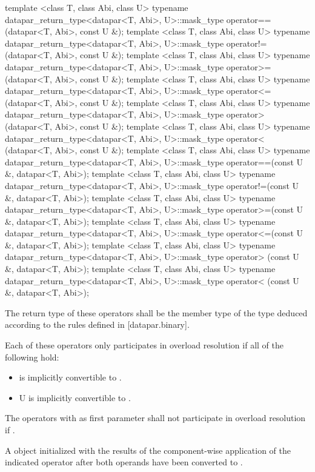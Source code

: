\begin{itemdecl}
template <class T, class Abi, class U>
typename datapar_return_type<datapar<T, Abi>, U>::mask_type operator==(datapar<T, Abi>, const U &);
template <class T, class Abi, class U>
typename datapar_return_type<datapar<T, Abi>, U>::mask_type operator!=(datapar<T, Abi>, const U &);
template <class T, class Abi, class U>
typename datapar_return_type<datapar<T, Abi>, U>::mask_type operator>=(datapar<T, Abi>, const U &);
template <class T, class Abi, class U>
typename datapar_return_type<datapar<T, Abi>, U>::mask_type operator<=(datapar<T, Abi>, const U &);
template <class T, class Abi, class U>
typename datapar_return_type<datapar<T, Abi>, U>::mask_type operator> (datapar<T, Abi>, const U &);
template <class T, class Abi, class U>
typename datapar_return_type<datapar<T, Abi>, U>::mask_type operator< (datapar<T, Abi>, const U &);
template <class T, class Abi, class U>
typename datapar_return_type<datapar<T, Abi>, U>::mask_type operator==(const U &, datapar<T, Abi>);
template <class T, class Abi, class U>
typename datapar_return_type<datapar<T, Abi>, U>::mask_type operator!=(const U &, datapar<T, Abi>);
template <class T, class Abi, class U>
typename datapar_return_type<datapar<T, Abi>, U>::mask_type operator>=(const U &, datapar<T, Abi>);
template <class T, class Abi, class U>
typename datapar_return_type<datapar<T, Abi>, U>::mask_type operator<=(const U &, datapar<T, Abi>);
template <class T, class Abi, class U>
typename datapar_return_type<datapar<T, Abi>, U>::mask_type operator> (const U &, datapar<T, Abi>);
template <class T, class Abi, class U>
typename datapar_return_type<datapar<T, Abi>, U>::mask_type operator< (const U &, datapar<T, Abi>);
\end{itemdecl}
\begin{itemdescr}
  \pnum\remarks The return type of these operators shall be the  member type of the type deduced according to the rules defined in [datapar.binary].

  \pnum\remarks Each of these operators only participates in overload resolution if all of the following hold:
  \begin{itemize}
    \item \datapar{} is implicitly convertible to .
    \item \type U is implicitly convertible to .
  \end{itemize}

  \pnum\remarks The operators with  as first parameter shall not participate in overload resolution if .

  \pnum\returns A \mask object initialized with the results of the component-wise application of the indicated operator after both operands have been converted to .
\end{itemdescr}

